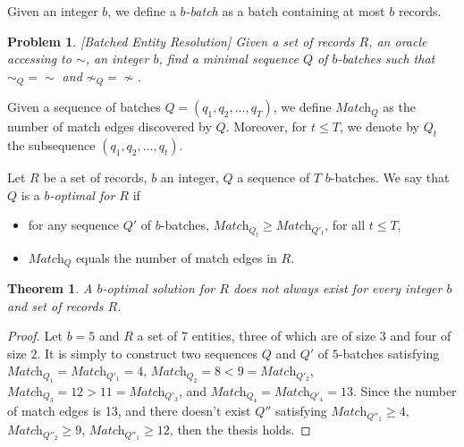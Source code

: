 \documentclass[sigconf, nonacm]{acmart}
\newcommand{\match}{\textit{Match}\xspace}
\newcommand{\blue}[1]{\textcolor{blue}{#1}}
\newtheorem{theorem}{Theorem}[section]
\newtheorem{problem}{Problem}
\begin{document}
Given an integer $b$, we define a \emph{$b$-batch} as a batch containing at most $b$ records.


\begin{problem}\label{prob:batch_entity_resolution_BER}[Batched Entity Resolution]
    Given a set of records $R$, an oracle accessing to $\sim$, an integer $b$, find a minimal sequence $Q$ of $b$-batches such that $\sim_Q = \sim$ and $\not\sim_Q =\not\sim$.   
\end{problem}



Given a sequence of batches $Q = (q_1,q_2,\ldots,q_T)$, we define $\match_Q$ as the number of match edges discovered by $Q$. Moreover, for $t\leq T$, we denote by $Q_t$ the subsequence $(q_1,q_2,\ldots,q_t)$.

\begin{definition}
    Let $R$ be a set of records, $b$ an integer, $Q$ a sequence of $T$ $b$-batches. We say that $Q$ is a \emph{$b$-optimal for $R$} if
    \begin{itemize}
        \item for any sequence $Q'$ of $b$-batches, $\match_{Q_t}  \geq \match_{Q'_t}$, for all $t\leq T$,
        \item $\match_{Q}$ equals the number of match edges in $R$.
    \end{itemize}
\end{definition}



\begin{theorem}\label{th:b_optimal_solution_not_exist}
    A $b$-optimal solution for $R$ does not always exist for every integer $b$ and set of records $R$.
\end{theorem}
\begin{proof}
    Let $b=5$ and $R$ a set of 7 entities, three of which are of size 3 and four of size 2. It is simply to construct two sequences $Q$ and $Q'$ of $5$-batches satisfying $\match_{Q_1} = \match_{Q'_1} = 4$, $\match_{Q_2} = 8 < 9 = \match_{Q'_2}$, $\match_{Q_3} = 12 > 11 = \match_{Q'_3}$, and $\match_{Q_4} = \match_{Q'_4} = 13$. Since the number of match edges is 13, and there doesn't exist $Q''$ satisfying $\match_{Q''_1} \geq 4$, $\match_{Q''_2} \geq 9$, $\match_{Q''_1} \geq 12$, then the thesis holds.  
\end{proof}
\end{document}
